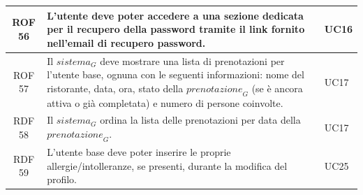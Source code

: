 \documentclass[12pt, oneside]{article}
\begin{document}
\begin{longtable}{|c|p{14cm}|p{2cm}|}
    \hline
    ROF 56 & L'utente deve poter accedere a una sezione dedicata per il recupero della password tramite il link fornito nell'email di recupero password.  & UC16 \\
    \hline
    ROF 57 & Il $\textit{sistema}_G$ deve mostrare una lista di prenotazioni per l'utente base, ognuna con le seguenti informazioni:
    nome del ristorante, data, ora, stato della $\textit{prenotazione}_G$ (se è ancora attiva o già completata) e numero di persone coinvolte. & UC17 \\
    \hline
    RDF 58 & Il $\textit{sistema}_G$ ordina la lista delle prenotazioni per data della $\textit{prenotazione}_G$.  & UC17 \\
    \hline

    RDF 59 & L'utente base deve poter inserire le proprie allergie/intolleranze, se presenti, durante la modifica del profilo.  & UC25  \\
    \hline


\end{longtable}
\end{document}
